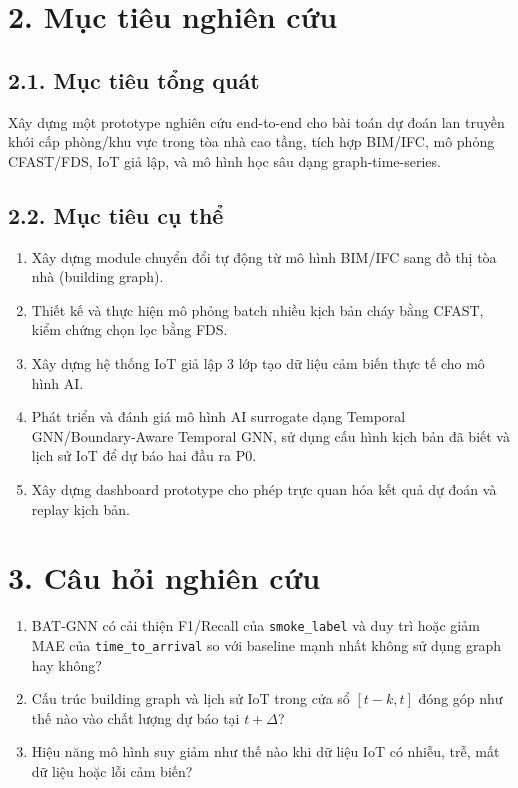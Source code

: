 \section*{2. Mục tiêu nghiên cứu}

\subsection*{2.1. Mục tiêu tổng quát}

Xây dựng một prototype nghiên cứu end-to-end cho bài toán dự đoán lan truyền khói cấp phòng/khu vực trong tòa nhà cao tầng, tích hợp BIM/IFC, mô phỏng CFAST/FDS, IoT giả lập, và mô hình học sâu dạng graph-time-series.

\subsection*{2.2. Mục tiêu cụ thể}

\begin{enumerate}
  \item Xây dựng module chuyển đổi tự động từ mô hình BIM/IFC sang đồ thị tòa nhà (building graph).
  \item Thiết kế và thực hiện mô phỏng batch nhiều kịch bản cháy bằng CFAST, kiểm chứng chọn lọc bằng FDS.
  \item Xây dựng hệ thống IoT giả lập 3 lớp tạo dữ liệu cảm biến thực tế cho mô hình AI.
  \item Phát triển và đánh giá mô hình AI surrogate dạng Temporal GNN/Boundary-Aware Temporal GNN, sử dụng cấu hình kịch bản đã biết và lịch sử IoT để dự báo hai đầu ra P0.
  \item Xây dựng dashboard prototype cho phép trực quan hóa kết quả dự đoán và replay kịch bản.
\end{enumerate}

\section*{3. Câu hỏi nghiên cứu}

\begin{enumerate}
  \item BAT-GNN có cải thiện F1/Recall của \texttt{smoke\_label} và duy trì hoặc giảm MAE của \texttt{time\_to\_arrival} so với baseline mạnh nhất không sử dụng graph hay không?
  \item Cấu trúc building graph và lịch sử IoT trong cửa sổ $[t-k,t]$ đóng góp như thế nào vào chất lượng dự báo tại $t+\Delta$?
  \item Hiệu năng mô hình suy giảm như thế nào khi dữ liệu IoT có nhiễu, trễ, mất dữ liệu hoặc lỗi cảm biến?
\end{enumerate}

